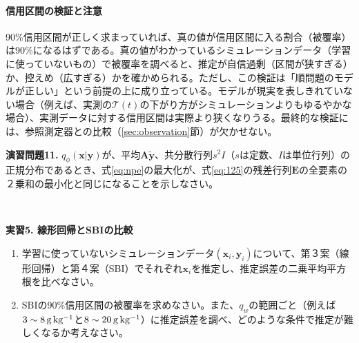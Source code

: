 \documentclass{ltjsarticle}
\begin{document}
\paragraph{信用区間の検証と注意}
90\%信用区間が正しく求まっていれば、真の値が信用区間に入る割合（被覆率）は90\%になるはずである。真の値がわかっているシミュレーションデータ（学習に使っていないもの）で被覆率を調べると、推定が自信過剰（区間が狭すぎる）か、控えめ（広すぎる）かを確かめられる。ただし、この検証は「順問題のモデルが正しい」という前提の上に成り立っている。モデルが現実を表しきれていない場合（例えば、実測の$\mathcal{T}(t)$の下がり方がシミュレーションよりもゆるやかな場合）、実測データに対する信用区間は実際より狭くなりうる。最終的な検証には、参照測定器との比較（\ref{sec:observation}節）が欠かせない。
\leavevmode \\
\begin{itembox}[l]{\bf{演習問題11.}}
$q_{\phi}(\bm{x}|\bm{y})$が、平均$\bm{A}\tilde{\bm{y}}$、共分散行列$s^{2}I$（$s$は定数、$I$は単位行列）の正規分布であるとき、式\eqref{eq:npe}の最大化が、式\eqref{eq:125}の残差行列$\bm{E}$の全要素の２乗和の最小化と同じになることを示しなさい。
\end{itembox}
\\
\begin{itembox}[l]{\bf{実習5. 線形回帰とSBIの比較}}
\begin{enumerate}
\item 学習に使っていないシミュレーションデータ$(\bm{x}_{i}, \bm{y}_{i})$について、第３案（線形回帰）と第４案（SBI）でそれぞれ$\bm{x}_{i}$を推定し、推定誤差の二乗平均平方根を比べなさい。
\item SBIの90\%信用区間の被覆率を求めなさい。また、$q_{w}$の範囲ごと（例えば$3\sim8\,\rm g\,kg^{-1}$と$8\sim20\,\rm g\,kg^{-1}$）に推定誤差を調べ、どのような条件で推定が難しくなるか考えなさい。
\end{enumerate}
\end{itembox}
\\
\end{document}
